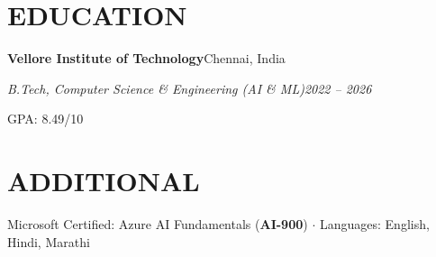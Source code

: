 \documentclass[10pt,a4paper]{article}
\newcommand{\entry}[2]{\noindent\textbf{#1}\hfill{\color{muted}#2}\par}
\newcommand{\subentry}[2]{\noindent\textit{#1}\hfill\textit{#2}\par}
\begin{document}
\section*{EDUCATION}
\entry{Vellore Institute of Technology}{Chennai, India}
\subentry{B.Tech, Computer Science \& Engineering (AI \& ML)}{2022 -- 2026}
{\small GPA: 8.49/10}

\section*{ADDITIONAL}
{\small Microsoft Certified: Azure AI Fundamentals (\textbf{AI-900}) \;$\cdot$\; Languages: English, Hindi, Marathi}
\end{document}
